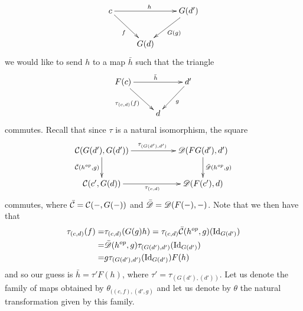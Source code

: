 \documentclass[11pt, a4paper, twoside]{article}
\begin{document}
\begin{displaymath}
	\xymatrix{
		c \ar[rd]_f \ar[rr]^h & & G(d') \ar[ld]^{G(g)}\\
		& G(d)
	} 
\end{displaymath}
we would like to send $h$ to a map $\bar{h}$ such that the triangle 
\begin{displaymath}
	\xymatrix{
		F(c) \ar[rd]_{\tau_{(c,d)}(f)} \ar[rr]^{\bar{h}} & & d' \ar[ld]^{g}\\
		& d
	} 
\end{displaymath}
commutes. Recall that since $\tau$ is a natural isomorphism, the square
\begin{displaymath}
	\xymatrix{
		\cC(G(d'),G(d')) \ar[rr]^{\tau_{(G(d'),d')}} \ar[d]_{\bar{\cC}(h^{op},g)} & & \cD(FG(d'),d') \ar[d]^{\bar{\cD}(h^{op},g)}\\
		\cC(c',G(d)) \ar[rr]_{\tau_{(c,d)}} & & \cD(F(c'),d)
	}
\end{displaymath}
commutes, where $\bar{\mathcal{C}}=\mathcal{C}(-,G(-))$ and $\bar{\mathscr D}=\mathscr D(F(-),-)$. Note that we then have that 
\begin{align*}
	\tau_{(c,d)}(f) =& \tau_{(c,d)}(G(g)h)= \tau_{(c,d)}\bar{\mathcal{C}}(h^{op},g)(\mathrm{Id}_{G(d')})\\
				   =& \bar{\mathscr D}(h^{op},g)\tau_{(G(d'),d')}(\mathrm{Id}_{G(d')})\\
				   =& g\tau_{(G(d'),d')}(\mathrm{Id}_{G(d')})F(h)
\end{align*}
and so our guess is $\bar{h}=\tau'F(h)$, where $\tau'=\tau_{(G(d'),(d'))}$. Let us denote the family of maps obtained by $\theta_{((c,f),(d',g)}$ and let us denote by $\theta$ the natural transformation given by this family. %
\end{document}
